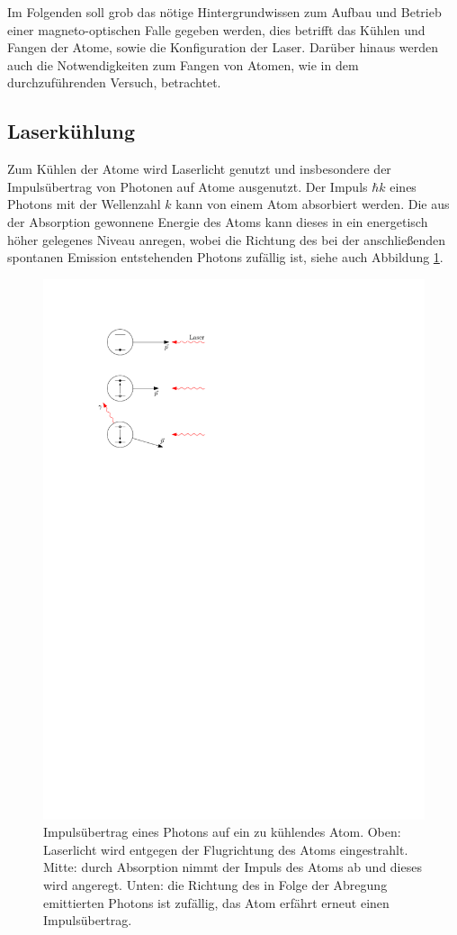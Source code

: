 \documentclass[11pt, a4paper]{article}
\numberwithin{equation}{section}
\begin{document}
Im Folgenden soll grob das nötige Hintergrundwissen zum Aufbau und Betrieb einer magneto-optischen Falle gegeben werden, dies betrifft das Kühlen und Fangen der Atome, sowie die Konfiguration der Laser.
Darüber hinaus werden auch die Notwendigkeiten zum Fangen von  Atomen, wie in dem durchzuführenden Versuch, betrachtet.

\subsection{Laserkühlung}

Zum Kühlen der Atome wird Laserlicht genutzt und insbesondere der Impulsübertrag von Photonen auf Atome ausgenutzt.
Der Impuls $\hbar k$ eines Photons mit der Wellenzahl $k$ kann von einem Atom absorbiert werden.
Die aus der Absorption gewonnene Energie des Atoms kann dieses in ein energetisch höher gelegenes Niveau anregen, wobei die Richtung des bei der anschließenden spontanen Emission entstehenden Photons zufällig ist, siehe auch Abbildung \ref{fig:streukraft}.
\begin{figure}[h]
	\centering
	\includegraphics{./figures/theory/streukraft.pdf}
	\caption{Impulsübertrag eines Photons auf ein zu kühlendes Atom. Oben: Laserlicht wird entgegen der Flugrichtung des Atoms eingestrahlt. Mitte: durch Absorption nimmt der Impuls des Atoms ab und dieses wird angeregt. Unten: die Richtung des in Folge der Abregung emittierten Photons ist zufällig, das Atom erfährt erneut einen Impulsübertrag.}
	\label{fig:streukraft}
\end{figure}
\end{document}
